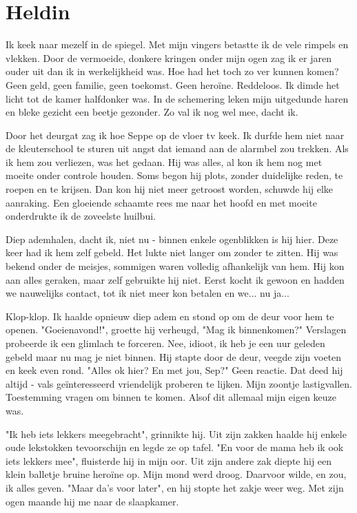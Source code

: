 \documentclass[12pt, justified, a4paper, symmetric]{tufte-book}
\begin{document}
\newpage
\section{Heldin}
Ik keek naar mezelf in de spiegel. Met mijn vingers betastte ik de vele rimpels en vlekken. Door de vermoeide, donkere kringen onder mijn ogen zag ik er jaren ouder uit dan ik in werkelijkheid was. Hoe had het toch zo ver kunnen komen? Geen geld, geen familie, geen toekomst. Geen hero\"ine. Reddeloos. Ik dimde het licht tot de kamer halfdonker was. In de schemering leken mijn uitgedunde haren en bleke gezicht een beetje gezonder. Zo val ik nog wel mee, dacht ik.

Door het deurgat zag ik hoe Seppe op de vloer tv keek. Ik durfde hem niet naar de kleuterschool te sturen uit angst dat iemand aan de alarmbel zou trekken. Als ik hem zou verliezen, was het gedaan. Hij was alles, al kon ik hem nog met moeite onder controle houden. Soms begon hij plots, zonder duidelijke reden, te roepen en te krijsen. Dan kon hij niet meer getroost worden, schuwde hij elke aanraking. Een gloeiende schaamte rees me naar het hoofd en met moeite onderdrukte ik de zoveelste huilbui.

Diep ademhalen, dacht ik, niet nu - binnen enkele ogenblikken is hij hier. Deze keer had ik hem zelf gebeld. Het lukte niet langer om zonder te zitten. Hij was bekend onder de meisjes, sommigen waren volledig afhankelijk van hem. Hij kon aan alles geraken, maar zelf gebruikte hij niet. Eerst kocht ik gewoon en hadden we nauwelijks contact, tot ik niet meer kon betalen en we... nu ja...

Klop-klop. Ik haalde opnieuw diep adem en stond op om de deur voor hem te openen.
"Goeienavond!", groette hij verheugd, "Mag ik binnenkomen?" Verslagen probeerde ik een glimlach te forceren. Nee, idioot, ik heb je een uur geleden gebeld maar nu mag je niet binnen. Hij stapte door de deur, veegde zijn voeten en keek even rond. "Alles ok hier? En met jou, Sep?" Geen reactie. Dat deed hij altijd - vals ge\"interesseerd vriendelijk proberen te lijken. Mijn zoontje lastigvallen. Toestemming vragen om binnen te komen. Alsof dit allemaal mijn eigen keuze was.

"Ik heb iets lekkers meegebracht", grinnikte hij. Uit zijn zakken haalde hij enkele oude lekstokken tevoorschijn en legde ze op tafel. "En voor de mama heb ik ook iets lekkers mee", fluisterde hij in mijn oor. Uit zijn andere zak diepte hij een klein balletje bruine hero\"ine op. Mijn mond werd droog. Daarvoor wilde, en zou, ik alles geven. "Maar da's voor later", en hij stopte het zakje weer weg. Met zijn ogen maande hij me naar de slaapkamer.
\end{document}
